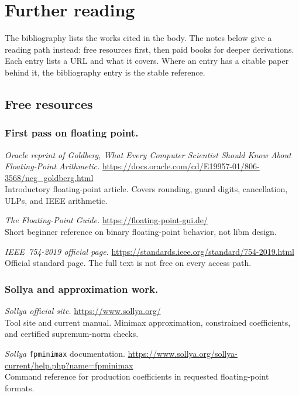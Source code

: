 \documentclass[manuscript, nonacm]{acmart}
\begin{document}


  \section{Further reading}

  The bibliography lists the works cited in the body. The notes below give a
  reading path instead: free resources first, then paid books for deeper
  derivations. Each entry lists a URL and what it covers. Where an entry has a
  citable paper behind it, the bibliography entry is the stable reference.

  \subsection{Free resources}

  \subsubsection{First pass on floating point.}

  \emph{Oracle reprint of Goldberg, What Every Computer Scientist Should Know
  About Floating-Point Arithmetic.}
  \url{https://docs.oracle.com/cd/E19957-01/806-3568/ncg_goldberg.html}\\
  Introductory floating-point article. Covers rounding, guard digits,
  cancellation, ULPs, and IEEE arithmetic.

  \emph{The Floating-Point Guide.}
  \url{https://floating-point-gui.de/}\\
  Short beginner reference on binary floating-point behavior, not libm design.

  \emph{IEEE~754-2019 official page.}
  \url{https://standards.ieee.org/standard/754-2019.html}\\
  Official standard page. The full text is not free on every access path.

  \subsubsection{Sollya and approximation work.}

  \emph{Sollya official site.}
  \url{https://www.sollya.org/}\\
  Tool site and current manual. Minimax approximation, constrained
  coefficients, and certified supremum-norm checks.

  \emph{Sollya} \texttt{fpminimax} documentation.
  \url{https://www.sollya.org/sollya-current/help.php?name=fpminimax}\\
  Command reference for production coefficients in requested floating-point
  formats.
\end{document}
